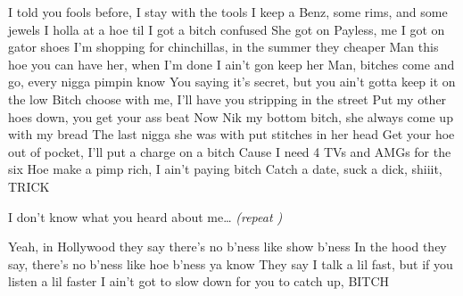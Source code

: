 \beginverse
I told you fools before, I stay with the tools 
I keep a Benz, some rims, and some jewels 
I holla at a hoe til I got a bitch confused 
She got on Payless, me I got on gator shoes 
I'm shopping for chinchillas, in the summer they cheaper 
Man this hoe you can have her, when I'm done I ain't gon keep her 
Man, bitches come and go, every nigga pimpin know 
You saying it's secret, but you ain't gotta keep it on the low 
Bitch choose with me, I'll have you stripping in the street 
Put my other hoes down, you get your ass beat 
Now Nik my bottom bitch, she always come up with my bread 
The last nigga she was with put stitches in her head 
Get your hoe out of pocket, I'll put a charge on a bitch 
Cause I need 4 TVs and AMGs for the six 
Hoe make a pimp rich, I ain't paying bitch 
Catch a date, suck a dick, shiiit, TRICK 
\endverse

\beginchorus
I don't know what you heard about me\dots
\textit{(repeat )}
\endchorus

\beginverse 
Yeah, in Hollywood they say there's no b'ness like show b'ness 
In the hood they say, there's no b'ness like hoe b'ness ya know 
They say I talk a lil fast, but if you listen a lil faster 
I ain't got to slow down for you to catch up, BITCH
\endverse
\endsong
